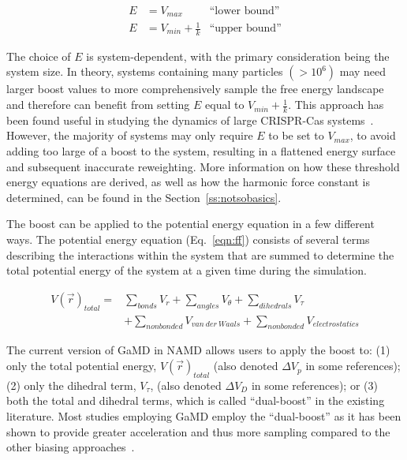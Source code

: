 \documentclass[9pt,tutorial]{livecoms}
\begin{document}
\begin{equation} 
    \begin{aligned}
    E & = V_{max} & \text{``lower bound''} \\
    E & = V_{min} + \frac{1}{k} & \text{``upper bound''}
    \end{aligned}
    \label{eqn:threshold}
\end{equation}

\bigskip

The choice of $E$ is system-dependent, with the primary consideration being the system size. In theory, systems containing many particles $\left(> 10^{6}\right)$ may need larger boost values to more comprehensively sample the free energy landscape and therefore can benefit from setting $E$ equal to $V_{min} + \frac{1}{k}$. This approach has been found useful in studying the dynamics of large CRISPR-Cas systems~\cite{wang_gaussian_2021}. However, the majority of systems may only require $E$ to be set to $V_{max}$, to avoid adding too large of a boost to the system, resulting in a flattened energy surface and subsequent inaccurate reweighting. More information on how these threshold energy equations are derived, as well as how the harmonic force constant is determined, can be found in the Section~\ref{ss:notsobasics}. 

The boost can be applied to the potential energy equation in a few different ways. The potential energy equation (Eq.~\ref{eqn:ff}) consists of several terms describing the interactions within the system that are summed to determine the total potential energy of the system at a given time during the simulation.

\begin{equation}  
    \begin{aligned}
    V\left(\vec{r}\right)_{total} =
    & \sum\limits_{bonds} V_{r} + \sum\limits_{angles} V_{\theta} + \sum\limits_{dihedrals} V_{\tau} \\
    & + \sum\limits_{nonbonded} V_{van~der~Waals} + 
    \sum\limits_{nonbonded} V_{electrostatics}
    \end{aligned}
    \label{eqn:ff}
\end{equation}

\bigskip

The current version of GaMD in NAMD allows users to apply the boost to: (1) only the total potential energy, $V\left(\vec{r}\right)_{total}$ (also denoted $\Delta{V_{p}}$ in some references); (2) only the dihedral term, $V_{\tau}$, (also denoted $\Delta{V_{D}}$ in some references); or (3) both the total and dihedral terms, which is called ``dual-boost'' in the existing literature. Most studies employing GaMD employ the ``dual-boost'' as it has been shown to provide greater acceleration and thus more sampling compared to the other biasing approaches~\cite{hamelberg_sampling_2007}.
\end{document}
